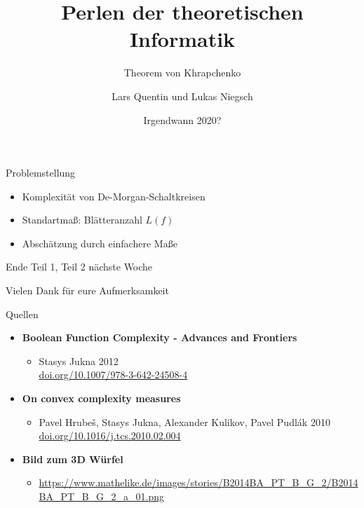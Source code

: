 \documentclass[12pt]{beamer}
\title{Perlen der theoretischen Informatik}
\subtitle{Theorem von Khrapchenko}
\author{Lars Quentin und Lukas Niegsch}
\institute{Georg-August-Universität Göttingen}
\date{Irgendwann 2020?}
\begin{document}
\frame{\titlepage}

\begin{frame}{}
    \begin{block}{Problemstellung}
        \begin{itemize}
            \item Komplexit\"at von De-Morgan-Schaltkreisen
            \pause
            \item Standartma\ss{}: Bl\"atteranzahl $L(f)$\\
            \pause
            \item Absch\"atzung durch einfachere Ma\ss{}e
        \end{itemize}
    \end{block}
\end{frame}



\begin{frame}{Ende Teil 1, Teil 2 nächste Woche}
\end{frame}




\begin{frame}{}
    \begin{block}{}
    \Large{Vielen Dank f\"ur eure Aufmerksamkeit}
    \end{block}
    
    \begin{block}{Quellen}
    \begin{itemize}
        \item \textbf{Boolean Function Complexity - Advances and Frontiers}
        \begin{itemize}
            \item Stasys Jukna 2012\\\url{doi.org/10.1007/978-3-642-24508-4}
        \end{itemize}
        \item \textbf{On convex complexity measures}
        \begin{itemize}
            \item Pavel Hrubeš, Stasys Jukna, Alexander Kulikov, Pavel Pudlák 2010\\\url{doi.org/10.1016/j.tcs.2010.02.004}
        \end{itemize}
        \item \textbf{Bild zum 3D Würfel} 
        \begin{itemize}
            \item \url{https://www.mathelike.de/images/stories/B2014BA_PT_B_G_2/B2014BA_PT_B_G_2_a_01.png}
        \end{itemize}
    \end{itemize}
    \end{block}
\end{frame}
\end{document}
